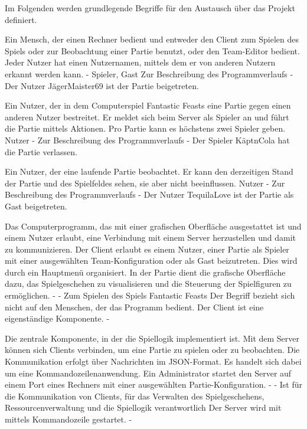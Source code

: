 Im Folgenden werden grundlegende Begriffe für den Austausch über das Projekt definiert.

{Ein Mensch, der einen Rechner bedient und entweder den Client zum Spielen des Spiels oder zur Beobachtung einer Partie benutzt, oder den Team-Editor bedient. Jeder Nutzer hat einen Nutzernamen, mittels dem er von anderen Nutzern erkannt werden kann.}
{-}
{Spieler, Gast}
{Zur Beschreibung des Programmverlaufs}
{-}
{Der Nutzer \glqq{}JägerMaister69\grqq{} ist der Partie beigetreten.}

{Ein Nutzer, der in dem Computerspiel \glqq{}Fantastic Feasts\grqq{} eine Partie gegen einen anderen Nutzer bestreitet. Er meldet sich beim Server als Spieler an und führt die Partie mittels Aktionen. Pro Partie kann es höchstens zwei Spieler geben.}
{Nutzer}
{-}
{Zur Beschreibung des Programmverlaufs}
{-}
{Der Spieler \glqq{}KäptnCola\grqq{} hat die Partie verlassen.}

{Ein Nutzer, der eine laufende Partie beobachtet. Er kann den derzeitigen Stand der Partie und des Spielfeldes sehen, sie aber nicht beeinflussen.}
{Nutzer}
{-}
{Zur Beschreibung des Programmverlaufs}
{-}
{Der Nutzer \glqq{}TequilaLove\grqq{} ist der Partie als Gast beigetreten.}

{Das Computerprogramm, das mit einer grafischen Oberfläche ausgestattet ist und einem Nutzer erlaubt, eine Verbindung mit einem Server herzustellen und damit zu kommunizieren. Der Client erlaubt es einem Nutzer, einer Partie als Spieler mit einer ausgewählten Team-Konfiguration oder als Gast beizutreten. Dies wird durch ein Hauptmenü organisiert. In der Partie dient die grafische Oberfläche dazu, das Spielgeschehen zu visualisieren und die Steuerung der Spielfiguren zu ermöglichen.}
{-}
{-}
{Zum Spielen des Spiels \glqq{}Fantastic Feasts\grqq{}}
{Der Begriff bezieht sich nicht auf den Menschen, der das Programm bedient. Der Client ist eine eigenständige Komponente.}
{-}

{Die zentrale Komponente, in der die Spiellogik implementiert ist. Mit dem Server können sich Clients verbinden, um eine Partie zu spielen oder zu beobachten. Die Kommunikation erfolgt über Nachrichten im JSON-Format. Es handelt sich dabei um eine Kommandozeilenanwendung. Ein Administrator startet den Server auf einem Port eines Rechners mit einer ausgewählten Partie-Konfiguration.}
{-}
{-}
{Ist für die Kommunikation von Clients, für das Verwalten des Spielgeschehens, Ressourcenverwaltung und die Spiellogik verantwortlich}
{Der Server wird mit mittels Kommandozeile gestartet.}
{-}

